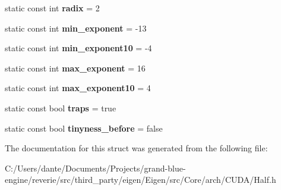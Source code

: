 \begin{DoxyCompactItemize}
\mbox{\label{structstd_1_1numeric__limits_3_01_eigen_1_1half_01_4_aa64c5d7a83f3b1ccd7e225e92d75656e}} 
static const int {\bfseries radix} = 2
\item 
\mbox{\label{structstd_1_1numeric__limits_3_01_eigen_1_1half_01_4_a3121b20003015b07c1a26de6a5520b8b}} 
static const int {\bfseries min\+\_\+exponent} = -\/13
\item 
\mbox{\label{structstd_1_1numeric__limits_3_01_eigen_1_1half_01_4_a5ae0620c190cbb2961036a605692e67c}} 
static const int {\bfseries min\+\_\+exponent10} = -\/4
\item 
\mbox{\label{structstd_1_1numeric__limits_3_01_eigen_1_1half_01_4_afd344b69d47d402b86994c84c8ad696e}} 
static const int {\bfseries max\+\_\+exponent} = 16
\item 
\mbox{\label{structstd_1_1numeric__limits_3_01_eigen_1_1half_01_4_ae8950570fa0c345492636b500fa00f23}} 
static const int {\bfseries max\+\_\+exponent10} = 4
\item 
\mbox{\label{structstd_1_1numeric__limits_3_01_eigen_1_1half_01_4_ad5e61e18c439dc0832c96cda98929b90}} 
static const bool {\bfseries traps} = true
\item 
\mbox{\label{structstd_1_1numeric__limits_3_01_eigen_1_1half_01_4_a95311da8f502dfe347c87a8e04065e4e}} 
static const bool {\bfseries tinyness\+\_\+before} = false
\end{DoxyCompactItemize}


The documentation for this struct was generated from the following file\+:\begin{DoxyCompactItemize}
\item 
C\+:/\+Users/dante/\+Documents/\+Projects/grand-\/blue-\/engine/reverie/src/third\+\_\+party/eigen/\+Eigen/src/\+Core/arch/\+C\+U\+D\+A/Half.\+h\end{DoxyCompactItemize}
